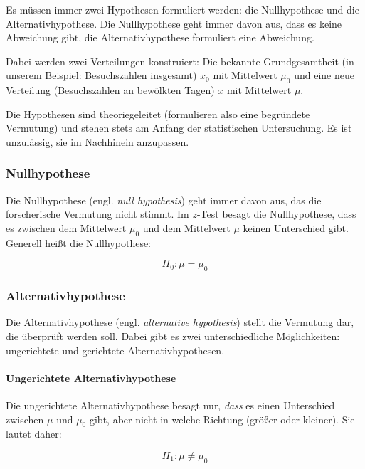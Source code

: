 \documentclass[
  11pt,
  ngerman,
  a4paper,
]{report}
\begin{document}
Es müssen immer zwei Hypothesen formuliert werden: die Nullhypothese und die Alternativhypothese. Die Nullhypothese geht immer davon aus, dass es keine Abweichung gibt, die Alternativhypothese formuliert eine Abweichung.

Dabei werden zwei Verteilungen konstruiert: Die bekannte Grundgesamtheit (in unserem Beispiel: Besuchszahlen insgesamt) \(x_0\) mit Mittelwert \(\mu_0\) und eine neue Verteilung (Besuchszahlen an bewölkten Tagen) \(x\) mit Mittelwert \(\mu\).

Die Hypothesen sind theoriegeleitet (formulieren also eine begründete Vermutung) und stehen stets am Anfang der statistischen Untersuchung. Es ist unzulässig, sie im Nachhinein anzupassen.

\hypertarget{nullhypothese}{%
\subsubsection{Nullhypothese}\label{nullhypothese}}

Die Nullhypothese (engl. \emph{null hypothesis}) geht immer davon aus, das die forscherische Vermutung nicht stimmt. Im \(z\)-Test besagt die Nullhypothese, dass es zwischen dem Mittelwert \(\mu_0\) und dem Mittelwert \(\mu\) keinen Unterschied gibt. Generell heißt die Nullhypothese:

\[
H_0 : \mu = \mu_0
\label{eq:h0}
\]

\hypertarget{alternativhypothese}{%
\subsubsection{Alternativhypothese}\label{alternativhypothese}}

Die Alternativhypothese (engl. \emph{alternative hypothesis}) stellt die Vermutung dar, die überprüft werden soll. Dabei gibt es zwei unterschiedliche Möglichkeiten: ungerichtete und gerichtete Alternativhypothesen.

\hypertarget{ungerichtete-alternativhypothese}{%
\paragraph{Ungerichtete Alternativhypothese}\label{ungerichtete-alternativhypothese}}

Die ungerichtete Alternativhypothese besagt nur, \emph{dass} es einen Unterschied zwischen \(\mu\) und \(\mu_0\) gibt, aber nicht in welche Richtung (größer oder kleiner). Sie lautet daher:

\[
H_1 : \mu \neq \mu_0
\label{eq:h1u}
\]
\end{document}
